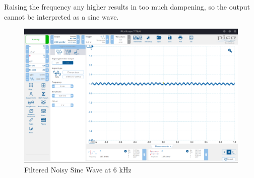 Raising the frequency any higher results in too much dampening, so the output cannot be interpreted as a sine wave.

\begin{figure}[H]
    \centering
    \includegraphics[width=150mm, keepaspectratio]{figures/filter6.png}
    \caption{Filtered Noisy Sine Wave at 6 kHz}
    \label{fig:filter6}
\end{figure}
